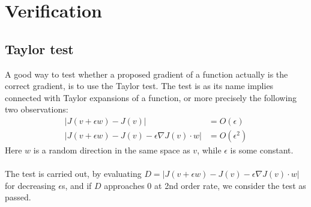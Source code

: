 \chapter{Verification}
\section{Taylor test}
A good way to test whether a proposed gradient of a function actually is the correct gradient, is to use the Taylor test. The test is as its name implies connected with Taylor expansions of a function, or more precisely the following two observations:
\begin{align*}
|J(v+\epsilon w)-J(v)| &= O(\epsilon) \\
|J(v+\epsilon w)-J(v)-\epsilon\nabla J(v)\cdot w| &= O(\epsilon^2)
\end{align*}
Here $w$ is a random direction in the same space as $v$, while $\epsilon$ is some constant. 
\\
\\
The test is carried out, by evaluating $D=|J(v+\epsilon w)-J(v)-\epsilon\nabla J(v)\cdot w|$ for decreasing $\epsilon$s, and if $D$ approaches 0 at 2nd order rate, we consider the test as passed.
